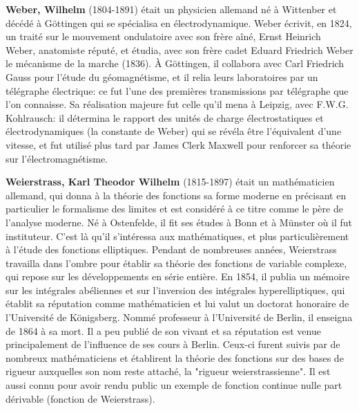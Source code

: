 \textbf{Weber, Wilhelm} (1804-1891) était un physicien allemand né à Wittenber et décédé à Göttingen qui se spécialisa en électrodynamique. Weber écrivit, en 1824, un traité sur le mouvement ondulatoire avec son frère aîné, Ernst Heinrich Weber, anatomiste réputé, et étudia, avec son frère cadet Eduard Friedrich Weber le mécanisme de la marche (1836). À Göttingen, il collabora avec Carl Friedrich Gauss pour l'étude du géomagnétisme, et il relia leurs laboratoires par un télégraphe électrique: ce fut l'une des premières transmissions par télégraphe que l'on connaisse. Sa réalisation majeure fut celle qu'il mena à Leipzig, avec F.W.G. Kohlrausch: il détermina le rapport des unités de charge électrostatiques et électrodynamiques (la constante de Weber) qui se révéla être l'équivalent d'une vitesse, et fut utilisé plus tard par James Clerk Maxwell pour renforcer sa théorie sur l'électromagnétisme.

\textbf{Weierstrass, Karl Theodor Wilhelm} (1815-1897) était un mathématicien allemand, qui donna à la théorie des fonctions sa forme moderne en précisant en particulier le formalisme des limites et est considéré à ce titre comme le père de l'analyse moderne. Né à Ostenfelde, il fit ses études à Bonn et à Münster où il fut instituteur. C'est là qu'il s'intéressa aux mathématiques, et plus particulièrement à l'étude des fonctions elliptiques. Pendant de nombreuses années, Weierstrass travailla dans l'ombre pour établir sa théorie des fonctions de variable complexe, qui repose sur les développements en série entière. En 1854, il publia un mémoire sur les intégrales abéliennes et sur l'inversion des intégrales hyperelliptiques, qui établit sa réputation comme mathématicien et lui valut un doctorat honoraire de l'Université de Königsberg. Nommé professeur à l'Université de Berlin, il enseigna de 1864 à sa mort. Il a peu publié de son vivant et sa réputation est venue principalement de l'influence de ses cours à Berlin. Ceux-ci furent suivis par de nombreux mathématiciens et établirent la théorie des fonctions sur des bases de rigueur auxquelles son nom reste attaché, la "rigueur weierstrassienne". Il est aussi connu pour avoir rendu public un exemple de fonction continue nulle part dérivable (fonction de Weierstrass).


